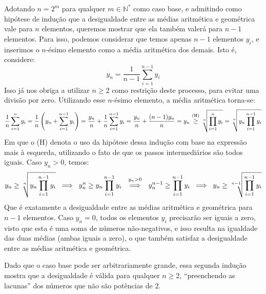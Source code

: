 Adotando $n = 2^m$ para qualquer $m \in \mathds{N}^*$ como caso base,
e admitindo como hipótese de indução
que a desigualdade entre as médias aritmética e geométrica
vale para $n$ elementos,
queremos mostrar que ela também valerá para $n-1$ elementos.
Para isso, podemos considerar que temos apenas $n-1$ elementos $y_i$,
e inserimos o $n$-ésimo elemento como a média aritmética dos demais.
Isto é, considere:
\[
  y_n = \dfrac{1}{n-1} \sum_{i=1}^{n-1} y_i
\]
Isso já nos obriga a utilizar $n \ge 2$
como restrição deste processo,
para evitar uma divisão por zero.
Utilizando esse $n$-ésimo elemento, a média aritmética torna-se:
\[
    \dfrac{1}{n} \sum_{i=1}^{n} y_i
  =
    \dfrac{1}{n} \left( y_n + \sum_{i=1}^{n-1} y_i \right)
  =
    \dfrac{y_n}{n} + \dfrac{1}{n} \sum_{i=1}^{n-1} y_i
  =
    \dfrac{y_n}{n} + \dfrac{(n - 1) y_n}{n}
  =
    y_n
  \stackfirst{\text{(H)}}{\ge}
    \sqrt[n]{\prod_{i=1}^n y_i}
  =
    \sqrt[n]{y_n \prod_{i=1}^{n-1} y_i}
\]
Em que o (H) denota o uso da hipótese dessa indução
com base na expressão mais à esquerda,
utilizando o fato de que os passos intermediários são todos iguais.
Caso $y_n > 0$, temos:
\[
    y_n \ge \sqrt[n]{y_n \prod_{i=1}^{n-1} y_i}
  \;\implies\;
    y_n^n \ge y_n \prod_{i=1}^{n-1} y_i
  \;\stackfirst{y_n > 0}{\implies}\;
    y_n^{n-1} \ge \prod_{i=1}^{n-1} y_i
  \;\implies\;
    y_n \ge \sqrt[n-1]{\prod_{i=1}^{n-1} y_i}
\]
Que é exatamente a desigualdade entre as médias aritmética e geométrica
para $n - 1$ elementos.
Caso $y_n = 0$, todos os elementos $y_i$ precisarão ser iguais a zero,
visto que esta é uma soma de números não-negativos,
e isso resulta na igualdade das duas médias (ambas iguais a zero),
o que também satisfaz
a desigualdade entre as médias aritmética e geométrica.

Dado que o caso base pode ser arbitrariamente grande,
essa segunda indução mostra que a desigualdade é válida
para qualquer $n \ge 2$,
``preenchendo as lacunas'' dos números que não são potências de $2$.
